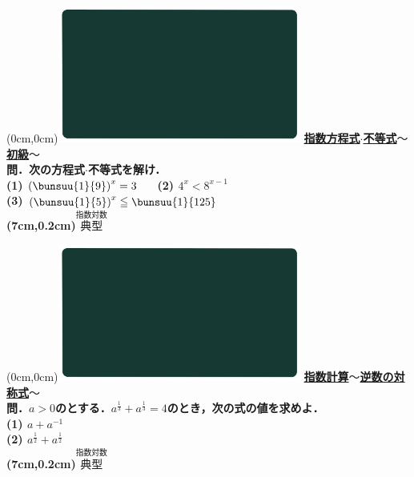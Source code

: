 \documentclass[10pt,
fleqn,
dvipdfmx,
uplatex
]{jsarticle}
\begin{document}
\newpage

\at(0cm,0cm){\includegraphics[width=8cm,bb=0 0 1920 1080]{./youtube/thumbnails/templates/smart_background/指数対数.jpeg}}
{\color{orange}\bf\boldmath\Large\underline{指数方程式$\cdot$不等式$〜$初級$〜$}}\vspace{0.3zw}\\
\Large 
\bf\boldmath 問．次の方程式$\cdot$不等式を解け．\vspace{0.3zw}\\
(1)  $\left(\bunsuu{1}{9}\right)^x=3$\ \ \ 
(2)  $4^x<8^{x-1}$\\
(3)  $\left(\bunsuu{1}{5}\right)^x\leqq \bunsuu{1}{{{125}}}$\\

\at(7cm,0.2cm){\small\color{bradorange}$\overset{\text{指数対数}}{\text{典型}}$}

\newpage

\at(0cm,0cm){\includegraphics[width=8cm,bb=0 0 1920 1080]{./youtube/thumbnails/templates/smart_background/指数対数.jpeg}}
{\color{orange}\bf\boldmath\Large\underline{指数計算$〜$逆数の対称式$〜$}}\vspace{0.3zw}\\
\Large 
\bf\boldmath 問．$a>0$のとする．$a^{\frac{1}{3}}+a^{\frac{1}{3}}=4$のとき，次の式の値を求めよ．\\
(1)  $a+a^{-1}$\\
(2)  $a^{\frac{1}{2}}+a^{\frac{1}{2}}$\\

\at(7cm,0.2cm){\small\color{bradorange}$\overset{\text{指数対数}}{\text{典型}}$}
\end{document}
